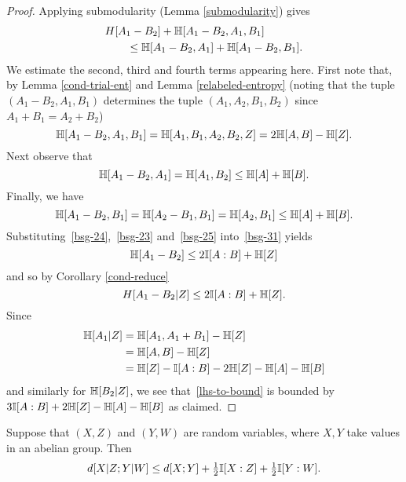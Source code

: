 \begin{proof}
Applying submodularity (Lemma \ref{submodularity}) gives
\begin{equation}\label{bsg-31} \begin{split}
&H[A_1 - B_2] + \mathbb{H}[A_1 - B_2, A_1, B_1] \\
&\qquad \leq \mathbb{H}[A_1 - B_2, A_1] + \mathbb{H}[A_1 - B_2,B_1].
\end{split}\end{equation}
We estimate the second, third and fourth terms appearing here.
First note that, by Lemma \ref{cond-trial-ent} and Lemma \ref{relabeled-entropy} (noting that the tuple $(A_1 - B_2, A_1, B_1)$  determines the tuple $(A_1, A_2, B_1, B_2)$ since $A_1+B_1=A_2+B_2$)
\begin{equation}\label{bsg-24} \mathbb{H}[A_1 - B_2, A_1, B_1] = \mathbb{H}[A_1, B_1, A_2, B_2,Z] = 2\mathbb{H}[A,B] - \mathbb{H}[Z].\end{equation}
Next observe that
\begin{equation}\label{bsg-23} \mathbb{H}[A_1 - B_2, A_1] = \mathbb{H}[A_1, B_2] \leq \mathbb{H}[A] + \mathbb{H}[B].
\end{equation}
Finally, we have
\begin{equation}\label{bsg-25} \mathbb{H}[A_1 - B_2, B_1] = \mathbb{H}[A_2 - B_1, B_1] = \mathbb{H}[A_2, B_1] \leq \mathbb{H}[A] + \mathbb{H}[B].\end{equation}
Substituting~\eqref{bsg-24},~\eqref{bsg-23} and~\eqref{bsg-25} into~\eqref{bsg-31} yields
\[ \mathbb{H}[A_1 - B_2] \leq 2 \mathbb{I}[A:B] + \mathbb{H}[Z]\] and so by Corollary \ref{cond-reduce}
\[H[A_1 - B_2 | Z]  \leq 2 \mathbb{I}[A:B] + \mathbb{H}[Z].\]
Since
\begin{align*} \mathbb{H}[A_1 | Z] & = \mathbb{H}[A_1, A_1 + B_1] - \mathbb{H}[Z] \\ & = \mathbb{H}[A,B] - \mathbb{H}[Z] \\ & = \mathbb{H}[Z] -  \mathbb{I}[A:B] - 2 \mathbb{H}[Z]- \mathbb{H}[A]-\mathbb{H}[B]\end{align*}
and similarly for $\mathbb{H}[B_2 | Z]$, we see that~\eqref{lhs-to-bound} is bounded by
$3 \mathbb{I}[A:B] + 2\mathbb{H}[Z]-\mathbb{H}[A]-\mathbb{H}[B]$ as claimed.
\end{proof}


\begin{lemma}\label{cond-dist-fact}
  \leanok
  Suppose that $(X, Z)$ and $(Y, W)$ are random variables, where $X, Y$ take values in an abelian group. Then
  \[    d[X  | Z;Y | W] \leq d[X; Y] + \tfrac{1}{2}  \mathbb{I}[X : Z] + \tfrac{1}{2}  \mathbb{I}[Y : W].\]
\end{lemma}

